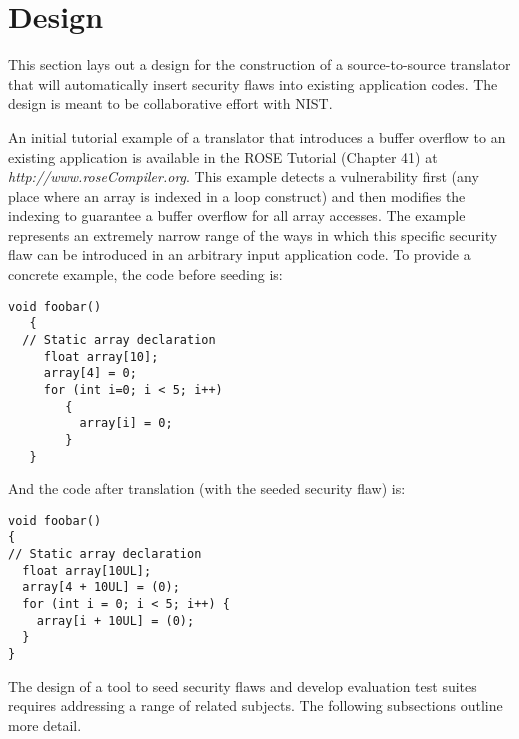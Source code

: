 \section{Design}

   This section lays out a design for the construction of a source-to-source
translator that will automatically insert security flaws into existing application codes.
The design is meant to be collaborative effort with NIST.

An initial tutorial example of a translator that introduces a 
buffer overflow to an existing application is available in the ROSE Tutorial
(Chapter 41) at {\em http://www.roseCompiler.org}.  This example detects a
vulnerability first (any place where an array is indexed in a loop construct)
and then modifies the indexing to guarantee a buffer overflow for all
array accesses.  The example represents an extremely narrow range of
the ways in which this specific security flaw can be introduced in an
arbitrary input application code.  To provide a concrete example, the code 
before seeding is:
{\mySmallFontSize
\begin{verbatim}
void foobar()
   {
  // Static array declaration
     float array[10];
     array[4] = 0;
     for (int i=0; i < 5; i++)
        {
          array[i] = 0;
        }
   }
\end{verbatim}
}
And the code after translation (with the seeded security flaw) is:
{\mySmallFontSize
\begin{verbatim}
void foobar()
{
// Static array declaration
  float array[10UL];
  array[4 + 10UL] = (0);
  for (int i = 0; i < 5; i++) {
    array[i + 10UL] = (0);
  }
}
\end{verbatim}
}

The design of a tool to seed security flaws and develop evaluation test suites requires
addressing a range of related subjects.  The following subsections outline more detail.
